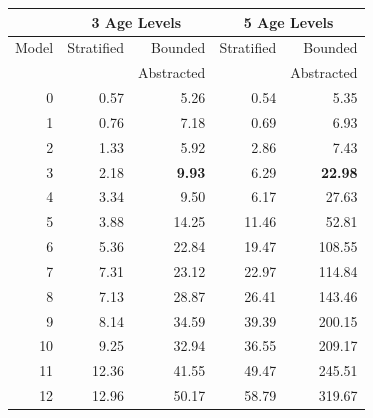 \begin{table}\centering
	\begin{tabular}{|r||r|r||r|r|}
		\hline      & \multicolumn{2}{|c||}{3 Age Levels} & \multicolumn{2}{|c|}{5 Age Levels}                              \\
		\hline	Model & Stratified                          & Bounded                            & Stratified   & Bounded     \\
		            &                                     & Abstracted                         &              & Abstracted  \\	\hline
		0           & 0.57                                & 5.26                               & 0.54         & 5.35        \\
		1           & 0.76                                & 7.18                               & 0.69         & 6.93        \\
		2           & 1.33                                & 5.92                               & 2.86         & 7.43        \\
		3           & 2.18                                & {\bf 9.93}                         & 6.29         & {\bf 22.98} \\
		4           & 3.34                                & 9.50                               & 6.17         & 27.63       \\
		5           & 3.88                                & 14.25                              & 11.46        & 52.81       \\
		6           & 5.36                                & 22.84                              & 19.47        & 108.55      \\
		7           & 7.31                                & 23.12                              & 22.97        & 114.84      \\
		8           & 7.13                                & 28.87                              & 26.41        & 143.46      \\
		9           & 8.14                                & 34.59                              & 39.39        & 200.15      \\
		10          & 9.25                                & 32.94                              & 36.55        & 209.17      \\
		11          & 12.36                               & 41.55                              & 49.47        & 245.51      \\
		12          & 12.96                               & 50.17                              & 58.79        & 319.67      \\

\end{tabular}
\end{table}
